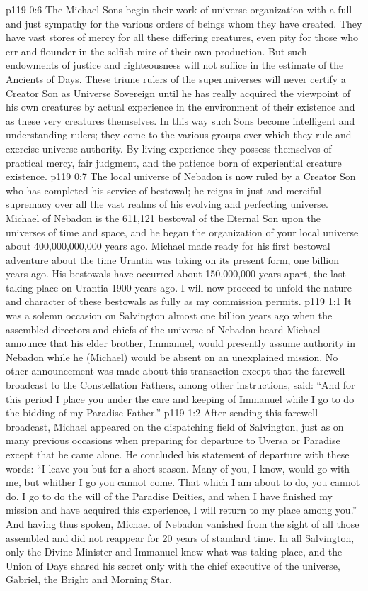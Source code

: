 \vs p119 0:6 The Michael Sons begin their work of universe organization with a full and just sympathy for the various orders of beings whom they have created. They have vast stores of mercy for all these differing creatures, even pity for those who err and flounder in the selfish mire of their own production. But such endowments of justice and righteousness will not suffice in the estimate of the Ancients of Days. These triune rulers of the superuniverses will never certify a Creator Son as Universe Sovereign until he has really acquired the viewpoint of his own creatures by actual experience in the environment of their existence and as these very creatures themselves. In this way such Sons become intelligent and understanding rulers; they come to  the various groups over which they rule and exercise universe authority. By living experience they possess themselves of practical mercy, fair judgment, and the patience born of experiential creature existence.
\vs p119 0:7 \pc The local universe of Nebadon is now ruled by a Creator Son who has completed his service of bestowal; he reigns in just and merciful supremacy over all the vast realms of his evolving and perfecting universe. Michael of Nebadon is the 611,121 bestowal of the Eternal Son upon the universes of time and space, and he began the organization of your local universe about 400,000,000,000 years ago. Michael made ready for his first bestowal adventure about the time Urantia was taking on its present form, one billion years ago. His bestowals have occurred about 150,000,000 years apart, the last taking place on Urantia 1900 years ago. I will now proceed to unfold the nature and character of these bestowals as fully as my commission permits.
\vs p119 1:1 It was a solemn occasion on Salvington almost one billion years ago when the assembled directors and chiefs of the universe of Nebadon heard Michael announce that his elder brother, Immanuel, would presently assume authority in Nebadon while he (Michael) would be absent on an unexplained mission. No other announcement was made about this transaction except that the farewell broadcast to the Constellation Fathers, among other instructions, said: “And for this period I place you under the care and keeping of Immanuel while I go to do the bidding of my Paradise Father.”
\vs p119 1:2 After sending this farewell broadcast, Michael appeared on the dispatching field of Salvington, just as on many previous occasions when preparing for departure to Uversa or Paradise except that he came alone. He concluded his statement of departure with these words: “I leave you but for a short season. Many of you, I know, would go with me, but whither I go you cannot come. That which I am about to do, you cannot do. I go to do the will of the Paradise Deities, and when I have finished my mission and have acquired this experience, I will return to my place among you.” And having thus spoken, Michael of Nebadon vanished from the sight of all those assembled and did not reappear for 20 years of standard time. In all Salvington, only the Divine Minister and Immanuel knew what was taking place, and the Union of Days shared his secret only with the chief executive of the universe, Gabriel, the Bright and Morning Star.
